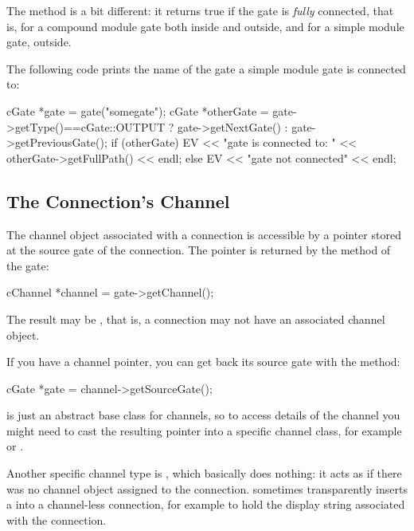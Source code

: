 The  method is a bit different: it returns true if the gate
is \textit{fully} connected, that is, for a compound module gate
both inside and outside, and for a simple module gate, outside.

The following code prints the name of the gate a simple module gate is
connected to:

\begin{cpp}
cGate *gate = gate("somegate");
cGate *otherGate = gate->getType()==cGate::OUTPUT ? gate->getNextGate() :
                                                    gate->getPreviousGate();
if (otherGate)
  EV << "gate is connected to: " << otherGate->getFullPath() << endl;
else
  EV << "gate not connected" << endl;
\end{cpp}


\subsection{The Connection's Channel}
\label{sec:simple-modules:connections-channel}

The channel object associated with a connection is accessible by
a pointer stored at the source gate of the connection. The pointer
is returned by the  method of the gate:

\begin{cpp}
cChannel *channel = gate->getChannel();
\end{cpp}

The result may be , that is, a connection may not have
an associated channel object.

If you have a channel pointer, you can get back its source gate
with the  method:

\begin{cpp}
cGate *gate = channel->getSourceGate();
\end{cpp}

 is just an abstract base class for channels, so
to access details of the channel you might need to cast the resulting
pointer into a specific channel class, for example 
or .

Another specific channel type is , which basically
does nothing: it acts as if there was no channel object assigned to the
connection. {\opp} sometimes transparently inserts a 
into a channel-less connection, for example to hold the display string
associated with the connection.

